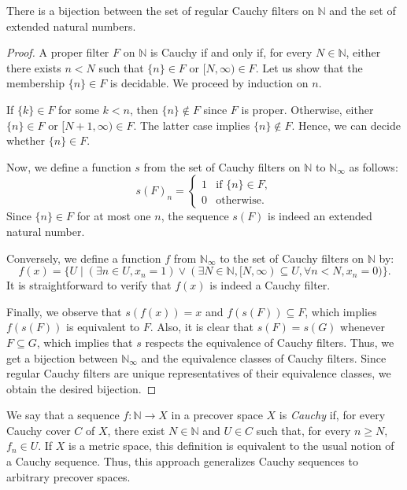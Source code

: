 \documentclass[reqno]{amsart}
\theoremstyle{definition}
\theoremstyle{remark}
\numberwithin{figure}{section}
\begin{document}
\begin{prop}
There is a bijection between the set of regular Cauchy filters on $\mathbb{N}$ and the set of extended natural numbers.
\end{prop}
\begin{proof}
A proper filter $F$ on $\mathbb{N}$ is Cauchy if and only if, for every $N \in \mathbb{N}$, either there exists $n < N$ such that $\{ n \} \in F$ or $[N,\infty) \in F$.
Let us show that the membership $\{ n \} \in F$ is decidable.
We proceed by induction on $n$.

If $\{ k \} \in F$ for some $k < n$, then $\{ n \} \notin F$ since $F$ is proper.
Otherwise, either $\{ n \} \in F$ or $[N + 1, \infty) \in F$.
The latter case implies $\{ n \} \notin F$.
Hence, we can decide whether $\{ n \} \in F$.

Now, we define a function $s$ from the set of Cauchy filters on $\mathbb{N}$ to $\mathbb{N}_\infty$ as follows:
\[ 
s(F)_n = 
\begin{cases} 
1 & \text{if } \{ n \} \in F, \\
0 & \text{otherwise}.
\end{cases}
\]
Since $\{ n \} \in F$ for at most one $n$, the sequence $s(F)$ is indeed an extended natural number.

Conversely, we define a function $f$ from $\mathbb{N}_\infty$ to the set of Cauchy filters on $\mathbb{N}$ by:
\[ f(x) = \{ U \mid (\exists n \in U, x_n = 1) \lor (\exists N \in \mathbb{N}, [N,\infty) \subseteq U, \forall n < N, x_n = 0) \}. \]
It is straightforward to verify that $f(x)$ is indeed a Cauchy filter.

Finally, we observe that $s(f(x)) = x$ and $f(s(F)) \subseteq F$, which implies $f(s(F))$ is equivalent to $F$.
Also, it is clear that $s(F) = s(G)$ whenever $F \subseteq G$, which implies that $s$ respects the equivalence of Cauchy filters.
Thus, we get a bijection between $\mathbb{N}_\infty$ and the equivalence classes of Cauchy filters.
Since regular Cauchy filters are unique representatives of their equivalence classes, we obtain the desired bijection.
\end{proof}

We say that a sequence $f : \mathbb{N} \to X$ in a precover space $X$ is \emph{Cauchy} if, for every Cauchy cover $C$ of $X$, there exist $N \in \mathbb{N}$ and $U \in C$ such that, for every $n \geq N$, $f_n \in U$.
If $X$ is a metric space, this definition is equivalent to the usual notion of a Cauchy sequence.
Thus, this approach generalizes Cauchy sequences to arbitrary precover spaces.
\end{document}
